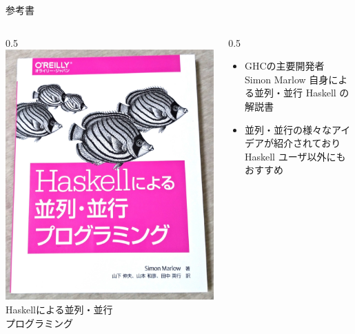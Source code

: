 \documentclass[unicode,12pt]{beamer}
\newlength{\mytotalwidth}
\newlength{\mycolumnwidth}
\begin{document}
\begin{frame}[plain]{参考書}
  \begin{columns}[totalwidth=\mytotalwidth]
    \begin{column}[T]{0.5\mycolumnwidth}
      \centering
      \includegraphics[width=\columnwidth]{pic/book.jpg} \\
      Haskellによる並列・並行\\ プログラミング
    \end{column}
    \begin{column}[t]{0.5\mycolumnwidth}
      \begin{itemize}
      \item GHCの主要開発者 Simon Marlow 自身による並列・並行 Haskell の解説書
      \item 並列・並行の様々なアイデアが紹介されており Haskell ユーザ以外にもおすすめ
      \end{itemize}
    \end{column}
  \end{columns}
  \centering
\end{frame}
\end{document}
